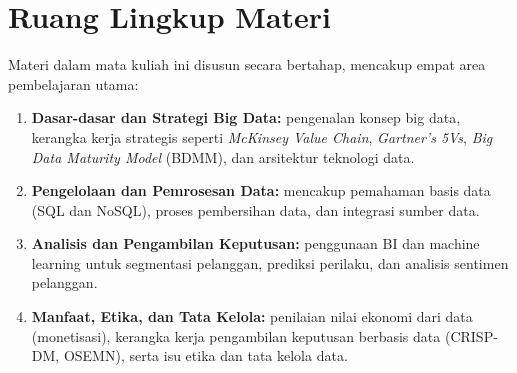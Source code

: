 \section{Ruang Lingkup Materi}

Materi dalam mata kuliah ini disusun secara bertahap, mencakup empat area pembelajaran utama:

\begin{enumerate}
	\item \textbf{Dasar-dasar dan Strategi Big Data:} pengenalan konsep big data, kerangka kerja strategis seperti \textit{McKinsey Value Chain}, \textit{Gartner’s 5Vs}, \textit{Big Data Maturity Model} (BDMM), dan arsitektur teknologi data.
	
	\item \textbf{Pengelolaan dan Pemrosesan Data:} mencakup pemahaman basis data (SQL dan NoSQL), proses pembersihan data, dan integrasi sumber data.
	
	\item \textbf{Analisis dan Pengambilan Keputusan:} penggunaan BI dan machine learning untuk segmentasi pelanggan, prediksi perilaku, dan analisis sentimen pelanggan.
	
	\item \textbf{Manfaat, Etika, dan Tata Kelola:} penilaian nilai ekonomi dari data (monetisasi), kerangka kerja pengambilan keputusan berbasis data (CRISP-DM, OSEMN), serta isu etika dan tata kelola data.
\end{enumerate}


